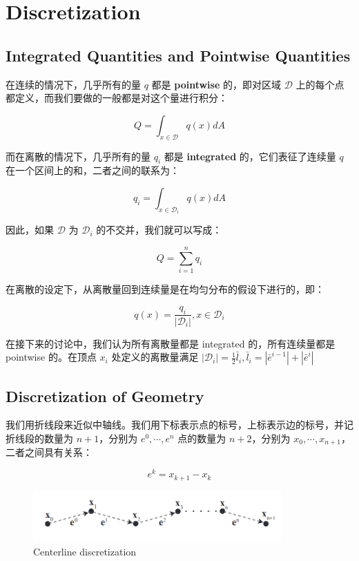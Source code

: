 \documentclass{notes}
\begin{document}
\section{Discretization}

\subsection{Integrated Quantities and Pointwise Quantities}

在连续的情况下，几乎所有的量 $q$ 都是 \textbf{pointwise} 的，即对区域 $\mathcal{D}$ 上的每个点都定义，而我们要做的一般都是对这个量进行积分：

$$Q = \int_{x \in \mathcal{D}} q(x) dA$$

而在离散的情况下，几乎所有的量 $q_i$ 都是 \textbf{integrated} 的，它们表征了连续量 $q$ 在一个区间上的和，二者之间的联系为：

$$q_i = \int_{x \in \mathcal{D}_i} q(x) dA$$

因此，如果 $\mathcal{D}$ 为 $\mathcal{D}_i$ 的不交并，我们就可以写成：

$$Q = \sum\limits_{i = 1}^{n} q_i$$

在离散的设定下，从离散量回到连续量是在均匀分布的假设下进行的，即：

\begin{equation}
	q(x) = \frac{q_i}{\left|\mathcal{D}_i\right|}, x \in \mathcal{D}_i
\end{equation}

在接下来的讨论中，我们认为所有离散量都是 integrated 的，所有连续量都是 pointwise 的。在顶点 $x_i$ 处定义的离散量满足 $\left|\mathcal{D}_i\right| = \frac{1}{2}  \bar{l}_i, \bar{l}_i = \left|\bar{e}^{i - 1}\right| + \left|\bar{e}^{i}\right|$

\subsection{Discretization of Geometry}

我们用折线段来近似中轴线。我们用下标表示点的标号，上标表示边的标号，并记折线段的数量为 $n + 1$，分别为 $e^0, \cdots, e^{n}$ 点的数量为 $n + 2$，分别为 $x_0, \cdots, x_{n + 1}$，二者之间具有关系：

\begin{equation}
	e^{k} = x_{k + 1} - x_{k}
\end{equation}

\begin{figure}[H]
	\centering
	\includegraphics[width=0.85\textwidth]{img/discrete-edge.png}
	\caption{Centerline discretization}
\end{figure}
\end{document}
